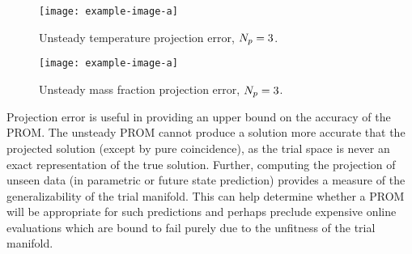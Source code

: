 \begin{figure}
    \begin{minipage}{0.45\linewidth}
        \texttt{[image: example-image-a]}
        \caption{\label{fig:projErrTempTime}Unsteady temperature projection error, $N_p = 3$.}
    \end{minipage}
    \hspace{1em}
    \begin{minipage}{0.45\linewidth}
        \texttt{[image: example-image-a]}
        \caption{\label{fig:projErrMFTime}Unsteady mass fraction projection error, $N_p = 3$.}
    \end{minipage}
\end{figure}
%

Projection error is useful in providing an upper bound on the accuracy of the PROM. The unsteady PROM cannot produce a solution more accurate that the projected solution (except by pure coincidence), as the trial space is never an exact representation of the true solution. Further, computing the projection of unseen data (in parametric or future state prediction) provides a measure of the generalizability of the trial manifold. This can help determine whether a PROM will be appropriate for such predictions and perhaps preclude expensive online evaluations which are bound to fail purely due to the unfitness of the trial manifold.